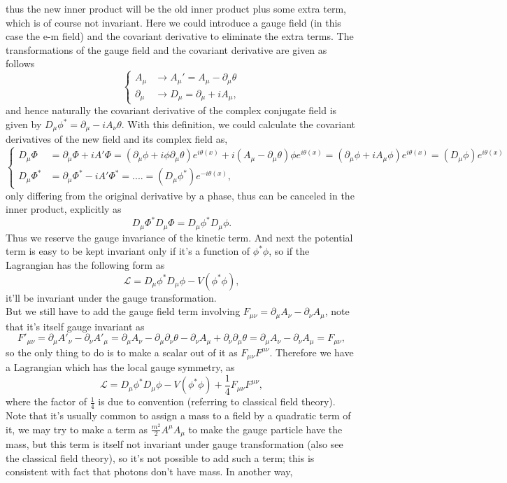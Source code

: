 \documentclass{article}
\newcommand{\be}{\begin{equation}}
\newcommand{\ee}{\end{equation}}
\newcommand{\p}{\partial}
\renewcommand{\1}{\left}
\renewcommand{\2}{\right}
\newcommand{\ma}{\mathcal}
\newcommand{\m}{\mu}
\newcommand{\n}{\nu}
\renewcommand{\th}{\theta}
\begin{document}
thus the new inner product will be the old inner product plus some extra term, which is of course not invariant. Here we could introduce a gauge field (in this case the e-m field) and the covariant derivative to eliminate the extra terms. The transformations of the gauge field and the covariant derivative are given as follows
\be\1\{\begin{split}
A_\m&\rightarrow A_\m'=A_\m-\p_\m\th \\
\p_\m&\rightarrow D_\m =\p_\m+iA_\m,
\end{split}\2.\ee
and hence naturally the covariant derivative of the complex conjugate field is given by $D_\m\phi^*=\p_\m-iA_\n\th$. With this definition, we could calculate the covariant derivatives of the new field and its complex field as,
\be\1\{\begin{split}
D_\m \Phi&=\p_\m \Phi +iA'\Phi =\1(\p_\m\phi+i\phi\p_\m\th\2)e^{i\th(x)}+i\1(A_\m-\p_\m\th\2)\phi e^{i\th(x)}=\1(\p_\m\phi+iA_\m\phi\2)e^{i\th(x)}=(D_\m\phi) e^{i\th(x)}\\
D_\m \Phi^*&=\p_\m \Phi^* -iA'\Phi^* =....=(D_\m\phi^*) e^{-i\th(x)},
\end{split}\2.\ee
only differing from the original derivative by a phase, thus can be canceled in the inner product, explicitly as
\be
D_\m \Phi^*D_\m \Phi=D_\m \phi^*D_\m \phi.
\ee
Thus we reserve the gauge invariance of the kinetic term. And next the potential term is easy to be kept invariant only if it's a function of $\phi^*\phi$, so if the Lagrangian has the following form as
\be \ma L=D_\m \phi^*D_\m \phi-V(\phi^*\phi), \ee
it'll be invariant under the gauge transformation.\\
But we still have to add the gauge field term involving $F_{\m\n}=\p_\m A_\n-\p_\n A_\m$, note that it's itself gauge invariant as
\be F'_{\m\n}=\p_\m A'_\n-\p_\n A'_\m=\p_\m A_\n-\p_\m\p_\n\th-\p_\n A_\m+\p_\n\p_\m\th=\p_\m A_\n-\p_\n A_\m=F_{\m\n}, \ee
so the only thing to do is to make a scalar out of it as $F_{\m\n}F^{\m\n}$. Therefore we have a Lagrangian which has the local gauge symmetry, as
\be \ma L=D_\m \phi^*D_\m \phi-V(\phi^*\phi)+\frac 1 4 F_{\m\n}F^{\m\n}, \ee
where the factor of $\frac 1 4$ is due to convention (referring to classical field theory). Note that it's usually common to assign a mass to a field by a quadratic term of it, we may try to make a term as $\frac {m^2} 2 A^\m A_\m$ to make the gauge particle have the mass, but this term is itself not invariant under gauge transformation (also see the classical field theory), so it's not possible to add such a term; this is consistent with fact that photons don't have mass. In another way,\\
\end{document}

